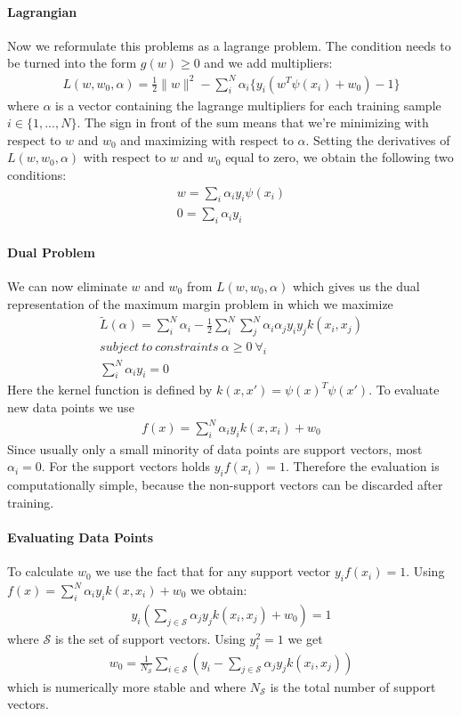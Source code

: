 \documentclass[main]{subfiles}
\begin{document}
\paragraph{Lagrangian}
Now we reformulate this problems as a lagrange problem. The condition needs to be turned into the form $g(w) \geq 0$ and we add multipliers:
\begin{align}
L(w,w_0,\alpha)=\frac{1}{2}\parallel w \parallel^2 - \sum_i^N \alpha_i \{y_i (w^T\psi(x_i) + w_0) - 1\}
\end{align}
where $\alpha$ is a vector containing the lagrange multipliers for each training sample $i \in \{1, ... ,N\}$. The sign in front of the sum means that we're minimizing with respect to $w$ and $w_0$ and maximizing with respect to $\alpha$. Setting the derivatives of $L(w,w_0,\alpha)$ with respect to $w$ and $w_0$ equal to zero, we obtain the following two conditions:
\begin{align}
w = \sum_i \alpha_i y_i \psi(x_i) \\
0 = \sum_i \alpha_i y_i
\end{align}
\paragraph{Dual Problem}
We can now eliminate $w$ and $w_0$ from $L(w,w_0,\alpha)$ which gives us the dual representation of the maximum margin problem in which we maximize
\begin{align}
\tilde{L}(\alpha)=\sum_i^N \alpha_i - \frac{1}{2} \sum_i^N \sum_j^N \alpha_i \alpha_j y_i y_j k(x_i, x_j) \\
subject \ to \ constraints \ \alpha  \geq 0 \ \forall_i \\
\sum_i^N \alpha_i y_i = 0
\end{align}
Here the kernel function is defined by $k(x, x')=\psi(x)^T \psi(x')$.
To evaluate new data points we use
\begin{align}
f(x)=\sum_i^N \alpha_i y_i k(x, x_i) + w_0
\end{align}
Since usually only a small minority of data points are support vectors, most $\alpha_i=0$. For the support vectors holds $y_if(x_i) = 1$. Therefore the evaluation is computationally simple, because the non-support vectors can be discarded after training. \newline
\paragraph{Evaluating Data Points}
To calculate $w_0$ we use the fact that for any support vector $y_if(x_i) = 1$. Using $f(x)=\sum_i^N \alpha_i y_i k(x, x_i) + w_0$ we obtain:
\begin{align}
y_i(\sum_{j \in \mathcal{S}} \alpha_j y_j k(x_i, x_j) + w_0) = 1
\end{align}
where $\mathcal{S}$ is the set of support vectors. Using $y_i^2=1$ we get
\begin{align}
w_0=\frac{1}{N_{\mathcal{S}}} \sum_{i \in \mathcal{S}} (y_i - \sum_{j \in \mathcal{S}} \alpha_j y_j k(x_i, x_j))
\end{align}
which is numerically more stable and where $N_{\mathcal{S}}$ is the total number of support vectors.
\end{document}
